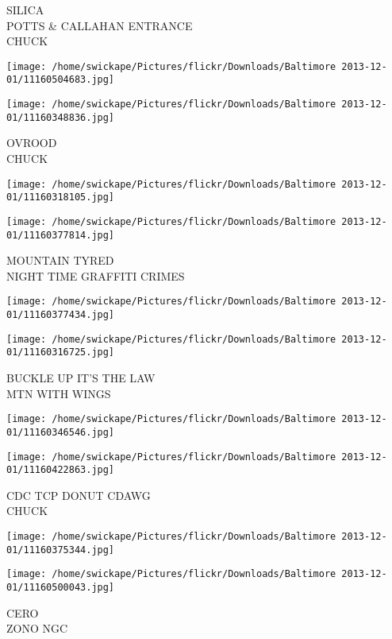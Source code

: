 \documentclass[10pt,letterpaper]{article}
\begin{document}
SILICA\\
POTTS \& CALLAHAN ENTRANCE\\
CHUCK
\pagebreak

\texttt{[image: /home/swickape/Pictures/flickr/Downloads/Baltimore 2013-12-01/11160504683.jpg]}

\vspace{0.25in}
\texttt{[image: /home/swickape/Pictures/flickr/Downloads/Baltimore 2013-12-01/11160348836.jpg]}

OVROOD\\
CHUCK
\pagebreak

\texttt{[image: /home/swickape/Pictures/flickr/Downloads/Baltimore 2013-12-01/11160318105.jpg]}

\vspace{0.25in}
\texttt{[image: /home/swickape/Pictures/flickr/Downloads/Baltimore 2013-12-01/11160377814.jpg]}

MOUNTAIN TYRED\\
NIGHT TIME GRAFFITI CRIMES
\pagebreak

\texttt{[image: /home/swickape/Pictures/flickr/Downloads/Baltimore 2013-12-01/11160377434.jpg]}

\vspace{0.25in}
\texttt{[image: /home/swickape/Pictures/flickr/Downloads/Baltimore 2013-12-01/11160316725.jpg]}

BUCKLE UP IT'S THE LAW\\
MTN WITH WINGS
\pagebreak

\texttt{[image: /home/swickape/Pictures/flickr/Downloads/Baltimore 2013-12-01/11160346546.jpg]}

\vspace{0.25in}
\texttt{[image: /home/swickape/Pictures/flickr/Downloads/Baltimore 2013-12-01/11160422863.jpg]}

CDC TCP DONUT CDAWG\\
CHUCK
\pagebreak

\texttt{[image: /home/swickape/Pictures/flickr/Downloads/Baltimore 2013-12-01/11160375344.jpg]}

\vspace{0.25in}
\texttt{[image: /home/swickape/Pictures/flickr/Downloads/Baltimore 2013-12-01/11160500043.jpg]}

CERO\\
ZONO NGC
\pagebreak
\end{document}
